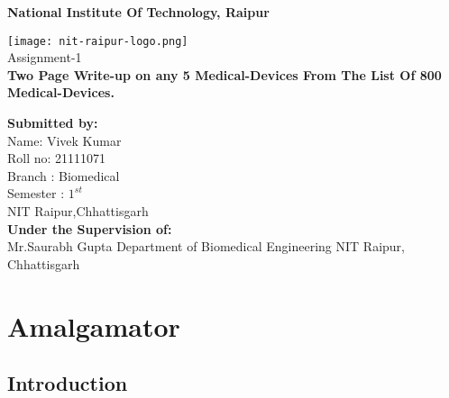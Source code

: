 \documentclass[12pt]{article}
\begin{document}
\pagestyle{empty}



   \begin{center}
       \vspace{1cm}
	   \Large
       \textbf{National Institute Of Technology, Raipur } 
       \vspace{1.5cm}
     
       \texttt{[image: nit-raipur-logo.png]}\\
       \vspace{0.8cm}
       \Huge
       Assignment-1\\
       \vspace{0.8cm}
      \textbf{  Two Page Write-up on any 5 Medical-Devices From The List Of 800 Medical-Devices.}
      
	\vfill      
      
   \begin{multicols}{2} 
   \begin{flushleft}
       \large
       \textbf{Submitted by:}\\
       Name: Vivek Kumar\\
       Roll no: 21111071\\
       Branch : Biomedical\\
       Semester : $1^{st}$ \\
       NIT Raipur,Chhattisgarh\\
       \columnbreak
       \textbf{Under the Supervision of:}\\
       Mr.Saurabh Gupta
       Department of Biomedical Engineering
       NIT Raipur, Chhattisgarh
    \end{flushleft}
    \end{multicols}    
            
   \end{center}

\clearpage
\pagestyle{fancy}
\tableofcontents
\clearpage
 \section{Amalgamator}
 \subsection{Introduction}
 \vspace{0.5cm}
\end{document}
